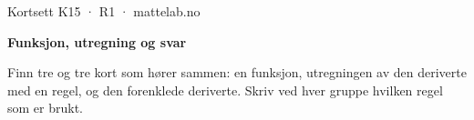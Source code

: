 \documentclass[11pt,a4paper]{article}
\begin{document}
\begin{minipage}[t]{0.8\linewidth}\vspace{0pt}
{\sffamily\small\color{dempet}Kortsett K15 · R1 · mattelab.no}\par\vspace{0.25em}
{\fontsize{20}{24}\selectfont\bfseries Funksjon, utregning og svar}\par\vspace{0.5em}
Finn tre og tre kort som hører sammen: en funksjon, utregningen av den deriverte med en regel, og den forenklede deriverte. Skriv ved hver gruppe hvilken regel som er brukt.\par{}
\end{minipage}\hfill
\begin{minipage}[t]{0.15\linewidth}\vspace{0pt}\raggedleft
{}
\end{minipage}\par\vspace{0.8em}
\end{document}

